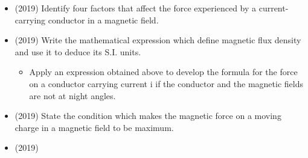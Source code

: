 \documentclass{article}
\begin{document}
\begin{itemize}
\item (2019)  Identify four factors that affect the force experienced by a current-carrying conductor in a magnetic field. 
\item (2019)  Write the mathematical expression which define magnetic flux density and use it to deduce its S.I. units. \begin{itemize}
\item Apply an expression obtained above to develop the formula for the force on a conductor carrying current i if the conductor and the magnetic fields are not at night angles.
\end{itemize}
\item (2019)  State the condition which makes the magnetic force on a moving charge in a magnetic field to be maximum. 
\item (2019)  \end{itemize}
\end{document}
